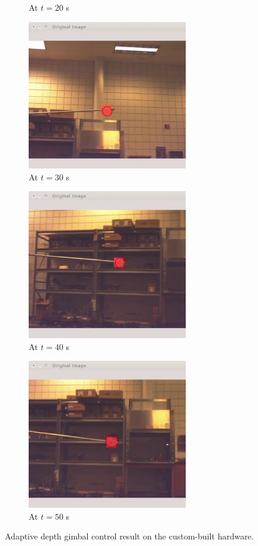 \begin{figure}[htbp]
\begin{subfigure}{0.5\textwidth}
		\caption{At $t=20$ s}
	\end{subfigure}%
	\begin{subfigure}{0.5\textwidth}
		\centering
		\includegraphics[height=6.5cm]{images/chapter2/gimbal_hardware_4.png}
		\caption{At $t=30$ s}
	\end{subfigure}	
	\begin{subfigure}{0.5\textwidth}
		\centering
		\includegraphics[height=6.5cm]{images/chapter2/gimbal_hardware_5.png}
		\caption{At $t=40$ s}
	\end{subfigure}%
	\begin{subfigure}{0.5\textwidth}
		\centering
		\includegraphics[height=6.5cm]{images/chapter2/gimbal_hardware_6.png}
		\caption{At $t=50$ s}
	\end{subfigure}	
	\caption{Adaptive depth gimbal control result on the custom-built hardware.}
	\label{gimbal_hardware_result}
\end{figure}

